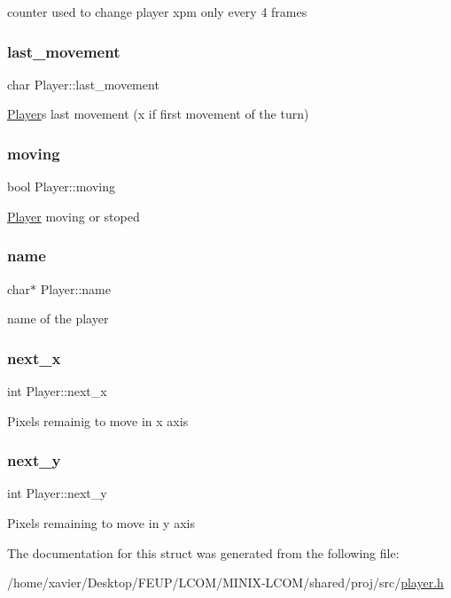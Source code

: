 counter used to change player xpm only every 4 frames \mbox{\label{structPlayer_a7243478dde989d49cb250b1020d9f7f9}} 
\subsubsection{\texorpdfstring{last\+\_\+movement}{last\_movement}}
{\footnotesize\ttfamily char Player\+::last\+\_\+movement}

\hyperlink{structPlayer}{Player}\textquotesingle{}s last movement (x if first movement of the turn) \mbox{\label{structPlayer_aaf48c4184bee665e1f7f625dedc25adf}} 
\subsubsection{\texorpdfstring{moving}{moving}}
{\footnotesize\ttfamily bool Player\+::moving}

\hyperlink{structPlayer}{Player} moving or stoped \mbox{\label{structPlayer_a4af4a10433f33834b59d0c3793358a40}} 
\subsubsection{\texorpdfstring{name}{name}}
{\footnotesize\ttfamily char$\ast$ Player\+::name}

name of the player \mbox{\label{structPlayer_a834748101caf4cab3c42ed1619793fbf}} 
\subsubsection{\texorpdfstring{next\+\_\+x}{next\_x}}
{\footnotesize\ttfamily int Player\+::next\+\_\+x}

Pixels remainig to move in x axis \mbox{\label{structPlayer_a8a1a06edc2b3ebae2705f1c4fc1917ff}} 
\subsubsection{\texorpdfstring{next\+\_\+y}{next\_y}}
{\footnotesize\ttfamily int Player\+::next\+\_\+y}

Pixels remaining to move in y axis 

The documentation for this struct was generated from the following file\+:\begin{DoxyCompactItemize}
\item 
/home/xavier/\+Desktop/\+F\+E\+U\+P/\+L\+C\+O\+M/\+M\+I\+N\+I\+X-\/\+L\+C\+O\+M/shared/proj/src/\hyperlink{player_8h}{player.\+h}\end{DoxyCompactItemize}

